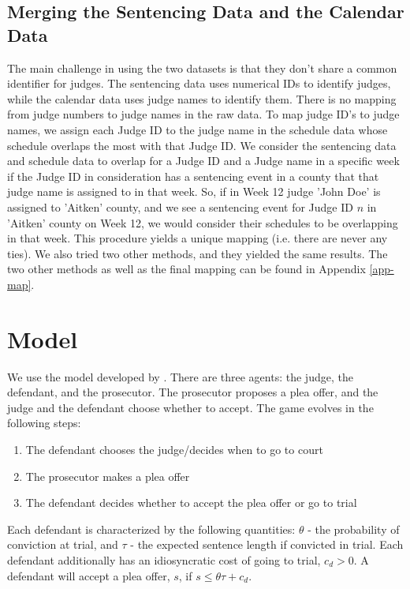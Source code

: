 \documentclass[11pt]{article}
\theoremstyle{ModifiedStyle}
\begin{document}
  \subsection{Merging the Sentencing Data and the Calendar Data}
    The main challenge in using the two datasets is that they don't share a common identifier for judges. The sentencing data uses numerical IDs to
    identify judges, while the calendar data uses judge names to identify them. There is no mapping from judge numbers to judge names in the raw data. To map judge ID's to judge names, we assign each Judge ID to the judge name in the schedule data whose schedule overlaps the most with that Judge ID. We consider the sentencing data and schedule data to overlap for a Judge ID and a Judge name in a specific week if the Judge ID in consideration has a sentencing event in a county that that judge name is assigned to in that week. So, if in Week 12 judge 'John Doe' is assigned to 'Aitken' county, and we see a sentencing event for Judge ID $n$ in 'Aitken' county on Week 12, we would consider their schedules to be overlapping in that week. This procedure yields a unique mapping (i.e. there are never any ties). We also tried two other methods, and they yielded the same results. The two other methods as well as the final mapping can be found in Appendix \ref{app-map}.

\section{Model}
  We use the model developed by \cite{wang2019}. There are three agents: the judge, the defendant, and the prosecutor. The prosecutor proposes a plea offer, and the judge and the defendant choose whether to accept. The game evolves in the following steps:

  \begin{enumerate}
    \item The defendant chooses the judge/decides when to go to court
    \item The prosecutor makes a plea offer
    \item The defendant decides whether to accept the plea offer or go to trial
  \end{enumerate}

  Each defendant is characterized by the following quantities: $\theta$ - the probability of conviction at trial, and $\tau$ - the expected sentence length if convicted in trial. Each defendant additionally has an idiosyncratic cost of going to trial, $c_d >0$. A defendant will accept a plea offer, $s$, if $s \leq \theta \tau + c_d$.\\
\end{document}
